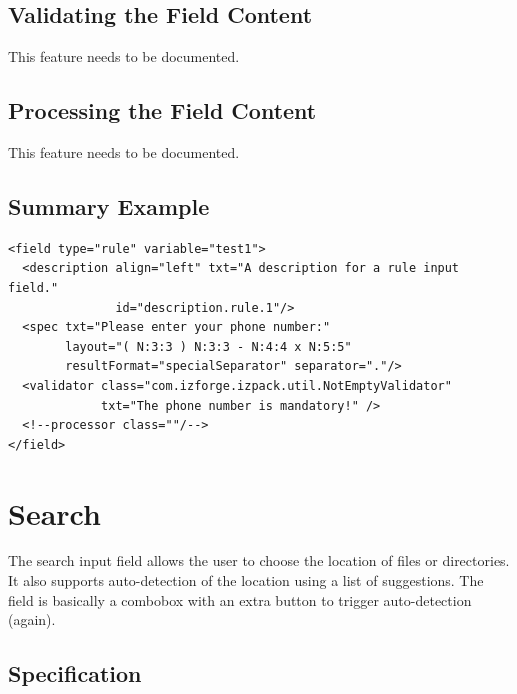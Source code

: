 \subsection{Validating the Field Content}

This feature needs to be documented.

\subsection{Processing the Field Content}

This feature needs to be documented.

\subsection{Summary Example}

\footnotesize
\begin{verbatim}
<field type="rule" variable="test1">
  <description align="left" txt="A description for a rule input field."
               id="description.rule.1"/>
  <spec txt="Please enter your phone number:" 
        layout="( N:3:3 ) N:3:3 - N:4:4 x N:5:5" 
        resultFormat="specialSeparator" separator="."/>
  <validator class="com.izforge.izpack.util.NotEmptyValidator"
             txt="The phone number is mandatory!" />
  <!--processor class=""/-->
</field>
\end{verbatim}
\normalsize

\section{Search}

The search input field allows the user to choose the location of files or
directories. It also supports auto-detection of the location using a list of 
suggestions. The field is basically a combobox with an extra button to
trigger auto-detection (again).

\begin{center}
\end{center}

\subsection{Specification}

